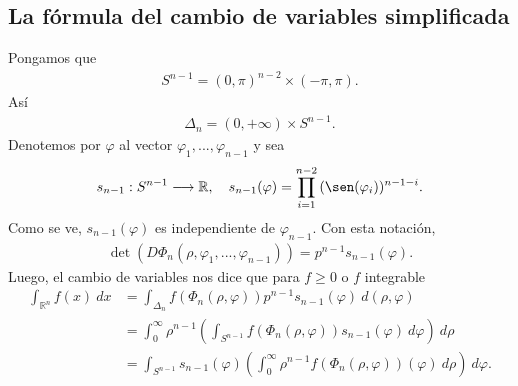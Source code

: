 \subsection{La fórmula del cambio de variables simplificada}
Pongamos que
\begin{align*}
    S^{n-1} = (0,\pi)^{n-2}\times(-\pi,\pi).
\end{align*}
Así
\begin{align*}
    \Delta_n = (0,+\infty)\times S^{n-1}.
\end{align*}
Denotemos por $\varphi$ al vector $\varphi_1,...,\varphi_{n-1}$ y sea
\begin{align*}
    s_{n-1} : S^{n-1} \longrightarrow \mathbb{R}, \ \ \ s_{n-1}(\varphi) = \prod_{i=1}^{n-2}{(\sen(\varphi_i))^{n-1-i}}.
\end{align*}
Como se ve, $s_{n-1}(\varphi)$ es independiente de $\varphi_{n-1}$. Con esta notación,
\begin{align*}
    \det(D\Phi_n(\rho,\varphi_1,...,\varphi_{n-1})) = p^{n-1}s_{n-1}(\varphi).
\end{align*}
Luego, el cambio de variables nos dice que para $f \ge 0$ o $f$ integrable
\begin{align*}
    \int_{\mathbb{R}^n}{f(x) \ dx} & = \int_{\Delta_n}{f(\Phi_n(\rho, \varphi))p^{n-1}s_{n-1}(\varphi) \ d(\rho, \varphi)}                                               \\
                                   & = \int_{0}^{\infty} \rho^{n-1}\left( \int_{S^{n-1}}{f(\Phi_n(\rho, \varphi))s_{n-1}(\varphi) \ d\varphi} \right) \ d\rho            \\
                                   & = \int_{S^{n-1}}  s_{n-1}(\varphi)\left( \int_{0}^{\infty}{\rho^{n-1}f(\Phi_n(\rho, \varphi))(\varphi) \ d\rho} \right) \ d\varphi.
\end{align*}

